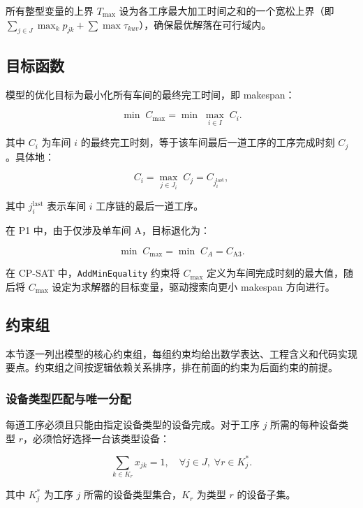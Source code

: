\documentclass[UTF8,a4paper,12pt]{ctexart}
\begin{document}
所有整型变量的上界 $T_{\max}$ 设为各工序最大加工时间之和的一个宽松上界（即 $\sum_{j \in J} \max_k p_{jk} + \sum \max \tau_{kuv}$），确保最优解落在可行域内。

\subsection{目标函数}
模型的优化目标为最小化所有车间的最终完工时间，即 makespan：

\begin{equation}
\min \; C_{\max} = \min \; \max_{i \in I} \; C_i.
\end{equation}

其中 $C_i$ 为车间 $i$ 的最终完工时刻，等于该车间最后一道工序的工序完成时刻 $C_j$。具体地：

\begin{equation}
C_i = \max_{j \in J_i} \; C_j = C_{j_i^{\text{last}}},
\end{equation}

其中 $j_i^{\text{last}}$ 表示车间 $i$ 工序链的最后一道工序。

在 P1 中，由于仅涉及单车间 A，目标退化为：

\begin{equation}
\min \; C_{\max} = \min \; C_A = C_{\text{A3}}.
\end{equation}

在 CP-SAT 中，\texttt{AddMinEquality} 约束将 $C_{\max}$ 定义为车间完成时刻的最大值，随后将 $C_{\max}$ 设定为求解器的目标变量，驱动搜索向更小 makespan 方向进行。

\subsection{约束组}
本节逐一列出模型的核心约束组，每组约束均给出数学表达、工程含义和代码实现要点。约束组之间按逻辑依赖关系排序，排在前面的约束为后面约束的前提。

\subsubsection{设备类型匹配与唯一分配}
每道工序必须且只能由指定设备类型的设备完成。对于工序 $j$ 所需的每种设备类型 $r$，必须恰好选择一台该类型设备：

\begin{equation}
\sum_{k \in K_r} x_{jk} = 1, \quad \forall j \in J, \; \forall r \in K_j^*.
\end{equation}

其中 $K_j^*$ 为工序 $j$ 所需的设备类型集合，$K_r$ 为类型 $r$ 的设备子集。
\end{document}
